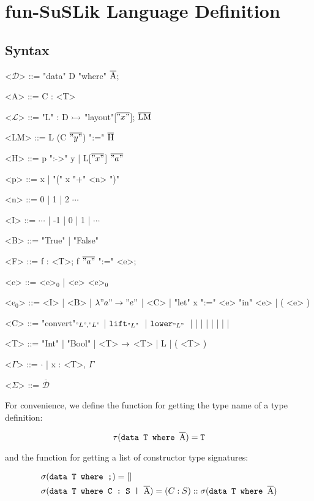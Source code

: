 \documentclass[10pt]{article}
\begin{document}
\section{fun-SuSLik Language Definition}
\label{sec:FSDef}
\subsection{Syntax}

\begin{grammar}
  <$\mathcal{D}$> ::= "data" D "where" $\overline{\textnormal{A}}$;

  <A> ::= C : <T>

  <$\mathcal{L}$> ::= "L" : D $\rightarrowtail$ "layout"[$\overline{"x"}$]; $\overline{\textnormal{LM}}$

  <LM> ::= L (C $\overline{"y"}$) ":=" $\overline{\textnormal{H}}$

  <H> ::= p ":->" y | L[$\overline{"x"}$] $\overline{"a"}$

  <p> ::= x | "(" x "+" <n> ")"

  <n> ::= 0 | 1 | 2 $\cdots$

  <I> ::= $\cdots$ | -1 | 0 | 1 | $\cdots$

  <B> ::= "True" | "False"

  <F> ::= f : <T>; f $\overline{"a"}$ ":=" <e>;

  <e> ::= <e>$_0$ | <e> <e>$_0$

  <e$_0$> ::= <I> | <B> | $\lambda "a" \rightarrow "e"$ | <C> | "let" x ":=" <e> "in" <e> | ( <e> )

  <C> ::= "convert"$_{"L","L"}$ | $\texttt{lift}_{"L"}\;$ | $\texttt{lower}_{"L"}\;$ | \ite\; | \lesseq\; | \eq\; | \add\; | \sub\; | \; | \; | 

  <T> ::= "Int" | "Bool" | <T> $\rightarrow$ <T> | L | ( <T> )

  <$\Gamma$> ::= $\cdot$ | x : <T>, $\Gamma$

  <$\Sigma$> ::= $\overline{\mathcal{D}}$
\end{grammar}

\noindent
For convenience, we define the function for getting the type name of a type definition:

\[
  \tau(\texttt{data T where }\overline{\textnormal{A}}) = \texttt{T}
\]

and the function for getting a list of constructor type signatures:

\begin{align*}
  &\sigma(\texttt{data T where ;}) = []
  \\
  &\sigma(\texttt{data T where C : S | }\overline{\textnormal{A}}) = (C : S) :: \sigma({\texttt{data T where }}\overline{\textnormal{A}})
\end{align*}
\end{document}
